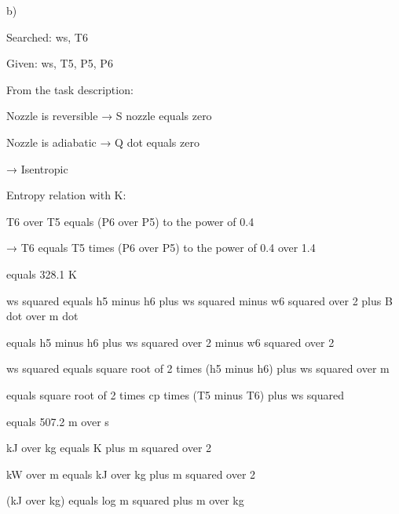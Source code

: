 b) 

Searched: ws, T6

Given: ws, T5, P5, P6

From the task description:

Nozzle is reversible → S nozzle equals zero

Nozzle is adiabatic → Q dot equals zero

→ Isentropic

Entropy relation with K:

T6 over T5 equals (P6 over P5) to the power of 0.4

→ T6 equals T5 times (P6 over P5) to the power of 0.4 over 1.4

equals 328.1 K

ws squared equals h5 minus h6 plus ws squared minus w6 squared over 2 plus B dot over m dot

equals h5 minus h6 plus ws squared over 2 minus w6 squared over 2

ws squared equals square root of 2 times (h5 minus h6) plus ws squared over m

equals square root of 2 times cp times (T5 minus T6) plus ws squared

equals 507.2 m over s

kJ over kg equals K plus m squared over 2

kW over m equals kJ over kg plus m squared over 2

(kJ over kg) equals log m squared plus m over kg